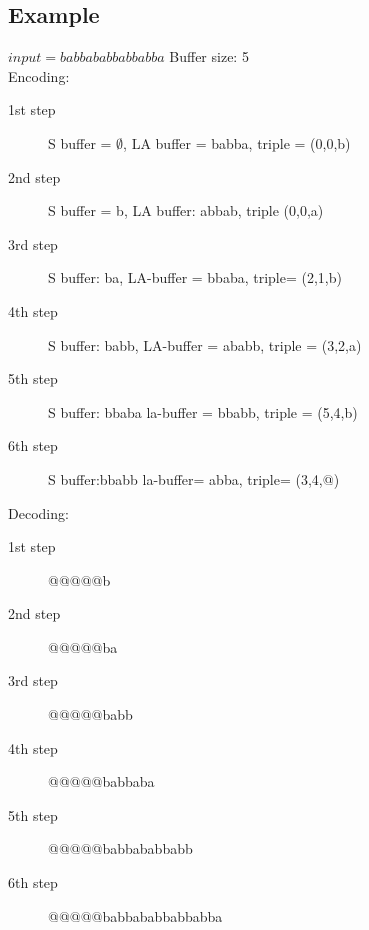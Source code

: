     \subsection*{Example}
    $input = babbababbabbabba $ Buffer size: 5\\
    Encoding:
    \begin{description}
        \item[1st step] S buffer = $\emptyset$, LA buffer = babba, triple = (0,0,b)
        \item[2nd step] S buffer = b, LA buffer: abbab, triple (0,0,a)
        \item[3rd step] S buffer: ba, LA-buffer = bbaba, triple= (2,1,b)
        \item[4th step] S buffer: babb, LA-buffer = ababb, triple = (3,2,a)
        \item[5th step] S buffer: bbaba la-buffer = bbabb, triple = (5,4,b)
        \item[6th step] S buffer:bbabb la-buffer= abba, triple= (3,4,@)
    \end{description}
    Decoding:
    \begin{description}
        \item[1st step] @@@@@b
        \item[2nd step] @@@@@ba
        \item[3rd step] @@@@@babb
        \item[4th step] @@@@@babbaba
        \item[5th step] @@@@@babbababbabb
        \item[6th step] @@@@@babbababbabbabba
    \end{description}
    

    